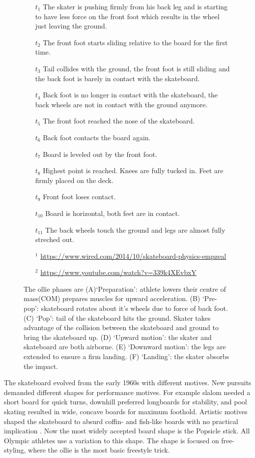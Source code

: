 \documentclass[default,iicol]{sn-jnl}
\theoremstyle{thmstyleone}%
\theoremstyle{thmstyletwo}%
\theoremstyle{thmstylethree}%
\begin{document}
\begin{figure}[t]
{    \footnotesize
    \begin{itemize}
      \item[$t_1$] The skater is pushing firmly from his back leg and is starting
        to have less force on the front foot which results in the wheel just
        leaving the ground.
      \item[$t_2$] The front foot starts sliding relative to the board for the
        first time.
      \item[$t_3$] Tail collides with the ground, the front foot is still sliding
        and the back foot is barely in contact with the skateboard.
      \item[$t_4$] Back foot is no longer in contact with the skateboard, the
        back wheels are not in contact with the ground anymore.
      \item[$t_5$] The front foot reached the nose of the skateboard.
      \item[$t_6$] Back foot contacts the board again.
      \item[$t_7$] Board is leveled out by the front foot.
      \item[$t_8$] Highest point is reached. Knees are fully tucked in. Feet are
        firmly placed on the deck.
      \item[$t_9$] Front foot loses contact.
      \item[$t_{10}$] Board is horizontal, both feet are in contact.
      \item[$t_{11}$] The back wheels touch the ground and legs are almost fully streched out.
      \item[$^1$] \url{https://www.wired.com/2014/10/skateboard-physics-empzeal}
      \item[$^2$] \url{https://www.youtube.com/watch?v=339k4XEvbxY}
    \end{itemize}
  }
  The ollie phases are (A)`Preparation': athlete lowers their centre of
  mass(COM) prepares muscles for upward acceleration. (B) `Pre-pop': skateboard
  rotates about it's wheels due to force of back foot. (C) `Pop': tail of the
  skateboard hits the ground. Skater takes advantage of the collision between
  the skateboard and ground to bring the skateboard up. (D) `Upward motion':
  the skater and skateboard are both airborne. (E) `Downward motion': the legs
  are extended to ensure a firm landing. (F) `Landing': the skater absorbs the
  impact.
  \label{fig:olliesteps}
\end{figure}

The skateboard evolved from the early 1960s with different motives. New pursuits demanded different shapes for performance motives. For example slalom needed a short board for quick turns, downhill preferred longboards for stability, and pool skating resulted in wide, concave boards for maximum foothold. Artistic motives shaped the skateboard to absurd coffin- and fish-like boards with no practical implication \cite{prentiss_get_2011}. Now the most widely accepted board shape is the Popsicle stick. All Olympic athletes use a variation to this shape. The shape is focused on free-styling, where the ollie is the most basic freestyle trick. 
\end{document}
